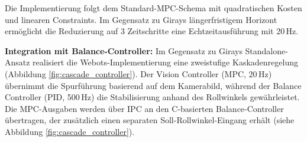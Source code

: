 Die Implementierung folgt dem Standard-MPC-Schema mit quadratischen Kosten und linearen Constraints. Im Gegensatz zu Girays 
längerfristigem Horizont ermöglicht die Reduzierung auf 3 Zeitschritte eine Echtzeitausführung mit 20\,Hz.

\textbf{Integration mit Balance-Controller:} Im Gegensatz zu Girays Standalone-Ansatz realisiert die Webots-Implementierung 
eine zweistufige Kaskadenregelung (Abbildung \ref{fig:cascade_controller}). Der Vision Controller (MPC, 20\,Hz) übernimmt die 
Spurführung basierend auf dem Kamerabild, während der Balance Controller (PID, 500\,Hz) die Stabilisierung anhand des Rollwinkels 
gewährleistet. Die MPC-Ausgaben werden über IPC an den C-basierten Balance-Controller übertragen, der zusätzlich einen separaten 
Soll-Rollwinkel-Eingang erhält (siehe Abbildung \ref{fig:cascade_controller}).


